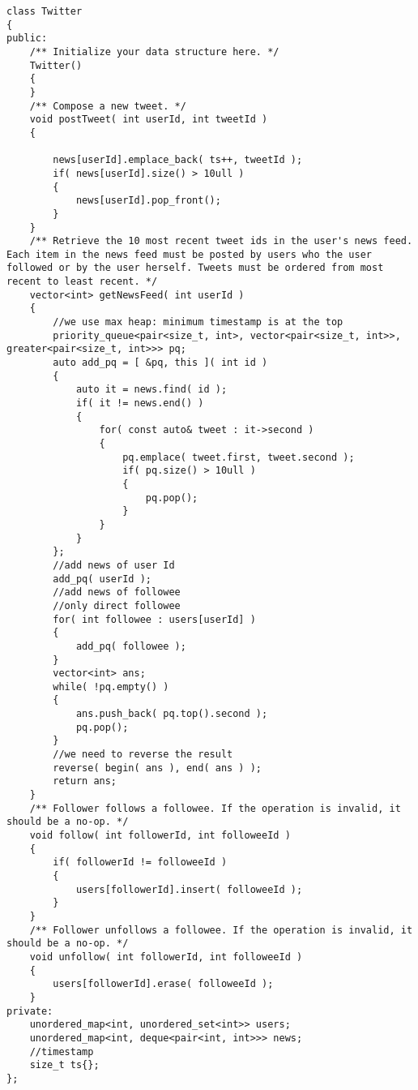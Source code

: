 \setcounter{lstlisting}{0}
\begin{lstlisting}[style=customc, caption={Priority Queue}]
class Twitter
{
public:
    /** Initialize your data structure here. */
    Twitter()
    {
    }
    /** Compose a new tweet. */
    void postTweet( int userId, int tweetId )
    {

        news[userId].emplace_back( ts++, tweetId );
        if( news[userId].size() > 10ull )
        {
            news[userId].pop_front();
        }
    }
    /** Retrieve the 10 most recent tweet ids in the user's news feed. Each item in the news feed must be posted by users who the user followed or by the user herself. Tweets must be ordered from most recent to least recent. */
    vector<int> getNewsFeed( int userId )
    {
        //we use max heap: minimum timestamp is at the top
        priority_queue<pair<size_t, int>, vector<pair<size_t, int>>, greater<pair<size_t, int>>> pq;
        auto add_pq = [ &pq, this ]( int id )
        {
            auto it = news.find( id );
            if( it != news.end() )
            {
                for( const auto& tweet : it->second )
                {
                    pq.emplace( tweet.first, tweet.second );
                    if( pq.size() > 10ull )
                    {
                        pq.pop();
                    }
                }
            }
        };
        //add news of user Id
        add_pq( userId );
        //add news of followee
        //only direct followee
        for( int followee : users[userId] )
        {
            add_pq( followee );
        }
        vector<int> ans;
        while( !pq.empty() )
        {
            ans.push_back( pq.top().second );
            pq.pop();
        }
        //we need to reverse the result
        reverse( begin( ans ), end( ans ) );
        return ans;
    }
    /** Follower follows a followee. If the operation is invalid, it should be a no-op. */
    void follow( int followerId, int followeeId )
    {
        if( followerId != followeeId )
        {
            users[followerId].insert( followeeId );
        }
    }
    /** Follower unfollows a followee. If the operation is invalid, it should be a no-op. */
    void unfollow( int followerId, int followeeId )
    {
        users[followerId].erase( followeeId );
    }
private:
    unordered_map<int, unordered_set<int>> users;
    unordered_map<int, deque<pair<int, int>>> news;
    //timestamp
    size_t ts{};
};
\end{lstlisting}